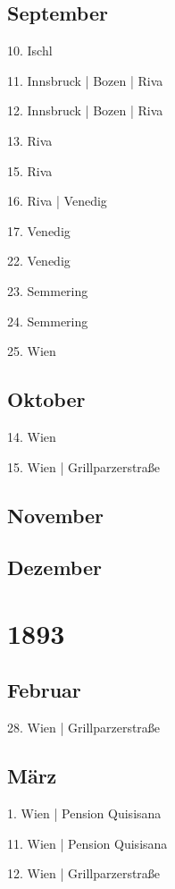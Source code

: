 \documentclass[twoside=false,titlepage=false,open=any, parskip=never, fontsize=10pt, headings=small, chapterprefix=false, appendixprefix=false, DIV=15]{scrbook}
\begin{document}
\begin{multicols}{3}
            \section*{September}
            10. Ischl\par
            11. Innsbruck | Bozen | Riva\par
            12. Innsbruck | Bozen | Riva\par
            13. Riva\par
            15. Riva\par
            16. Riva | Venedig\par
            17. Venedig\par
            22. Venedig\par
            23. Semmering\par
            24. Semmering\par
            25. Wien\par
            \section*{Oktober}
            14. Wien\par
            15. Wien | Grillparzerstraße\par
            \section*{November}
            \section*{Dezember}
            \chapter*{1893}
            \section*{Februar}
            28. Wien | Grillparzerstraße\par
            \section*{März}
            1. Wien | Pension Quisisana\par
            11. Wien | Pension Quisisana\par
            12. Wien | Grillparzerstraße\par

\end{multicols}
\end{document}
